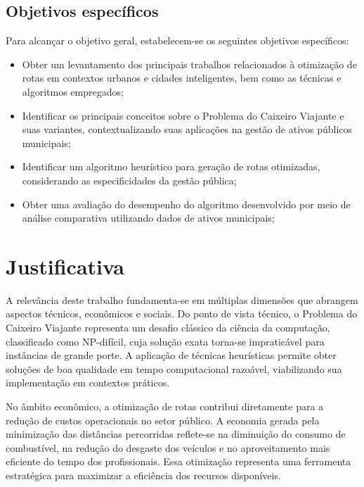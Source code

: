 \subsection{Objetivos específicos}
    Para alcançar o objetivo geral, estabelecem-se os seguintes objetivos específicos:
\begin{itemize}
    \item Obter um levantamento dos principais trabalhos relacionados 
    à otimização de rotas em contextos urbanos e cidades inteligentes, bem como as técnicas e algoritmos empregados;
    \item Identificar os principais conceitos sobre o Problema do Caixeiro Viajante e suas variantes, contextualizando suas 
    aplicações na gestão de ativos públicos municipais;
    \item Identificar um algoritmo heurístico para geração de rotas otimizadas, 
    considerando as especificidades da gestão pública;
    \item Obter uma avaliação do desempenho do algoritmo desenvolvido por meio de análise comparativa utilizando 
    dados de ativos municipais;
\end{itemize}

\section{Justificativa}

A relevância deste trabalho fundamenta-se em múltiplas dimensões que abrangem aspectos técnicos, econômicos e sociais. 
Do ponto de vista técnico, o Problema do Caixeiro Viajante representa um desafio clássico da ciência da computação, 
classificado como NP-difícil, cuja solução exata torna-se impraticável para instâncias de grande porte. 
A aplicação de técnicas heurísticas permite obter soluções de boa qualidade em tempo computacional razoável, 
viabilizando sua implementação em contextos práticos.

No âmbito econômico, a otimização de rotas contribui diretamente para a redução de custos operacionais 
no setor público. A economia gerada pela minimização das distâncias percorridas reflete-se na diminuição 
do consumo de combustível, na redução do desgaste dos veículos e no aproveitamento mais eficiente do 
tempo dos profissionais. Essa otimização representa uma ferramenta estratégica para maximizar a eficiência 
dos recursos disponíveis.

